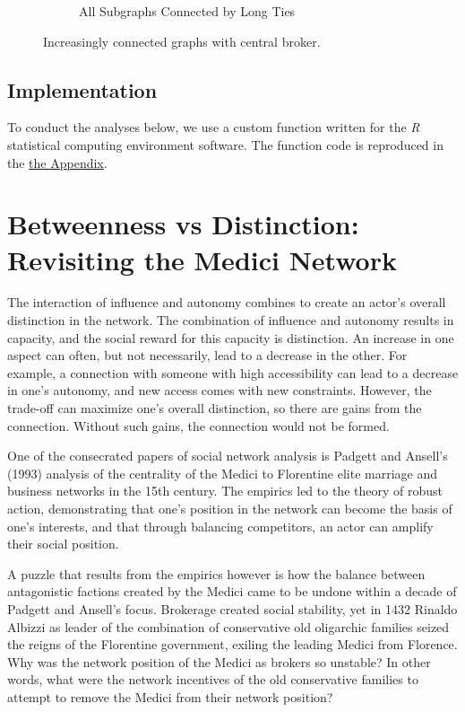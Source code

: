 \documentclass[12pt]{article}
\begin{document}
\begin{figure}
\begin{subfigure}[b]{0.45\textwidth}
            \caption{All Subgraphs Connected by Long Ties}
            \label{fig:Placehold}
    \end{subfigure}
    \caption{Increasingly connected graphs with central broker.}
    \label{fig:Evolving Political Network}
\end{figure}





\subsection{Implementation}
To conduct the analyses below, we use a custom function written for the \textit{R} statistical computing environment \citep{R} software. The function code is reproduced in the \hyperref[sec:appendix]{the Appendix}.

\section{Betweenness vs Distinction: Revisiting the Medici Network}
The interaction of influence and autonomy combines to create an actor’s overall distinction in the network. The combination of influence and autonomy results in capacity, and the social reward for this capacity is distinction. An increase in one aspect can often, but not necessarily, lead to a decrease in the other. For example, a connection with someone with high accessibility can lead to a decrease in one’s autonomy, and new access comes with new constraints. However, the trade-off can maximize one’s overall distinction, so there are gains from the connection. Without such gains, the connection would not be formed.

One of the consecrated papers of social network analysis is Padgett and Ansell’s (1993) analysis of the centrality of the Medici to Florentine elite marriage and business networks in the 15th century. The empirics led to the theory of robust action, demonstrating that one’s position in the network can become the basis of one’s interests, and that through balancing competitors, an actor can amplify their social position. 

A puzzle that results from the empirics however is how the balance between antagonistic factions created by the Medici came to be undone within a decade of Padgett and Ansell’s focus. Brokerage created social stability, yet in 1432 Rinaldo Albizzi as leader of the combination of conservative old oligarchic families seized the reigns of the Florentine government, exiling the leading Medici from Florence. Why was the network position of the Medici as brokers so unstable? In other words, what were the network incentives of the old conservative families to attempt to remove the Medici from their network position? 
\end{document}
